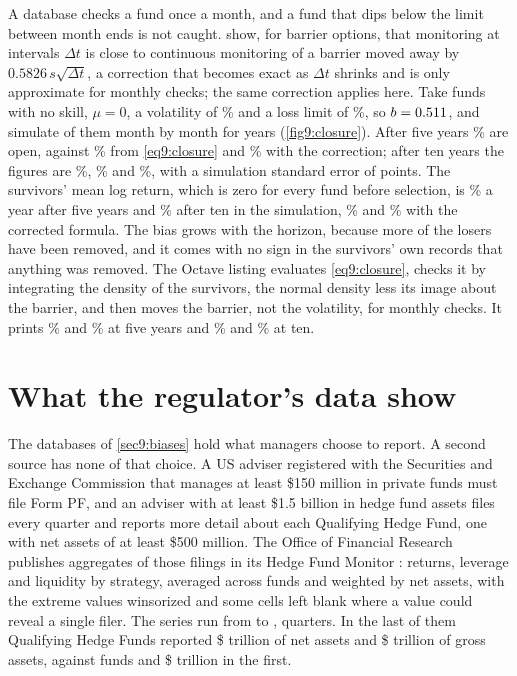 \begin{chapterrefs}
A database checks a fund once a month, and a fund that dips below the limit between month ends is not
caught. \textcite{broadie1997} show, for barrier options, that monitoring at intervals $\Delta t$ is close to
continuous monitoring of a barrier moved away by $0.5826\,s\sqrt{\Delta t}$, a correction that becomes
exact as $\Delta t$ shrinks and is only approximate for monthly checks; the same correction applies here. Take funds with no skill,
$\mu=0$, a volatility of \clSig\% and a loss limit of \clLoss\%, so $b=0.511$, and simulate \clFunds{} of them
month by month for \clYears{} years (\cref{fig9:closure}). After five years \clSurvSimFive\% are open, against
\clSurvFive\% from \cref{eq9:closure} and \clSurvBgkFive\% with the correction; after ten years the figures are
\clSurvSimTen\%, \clSurvTen\% and \clSurvBgkTen\%, with a simulation standard error of \clSurvSe{} points. The
survivors' mean log return, which is zero for every fund before selection, is \clMeanSimFive\% a year
after five years and \clMeanSimTen\% after ten in the simulation, \clMeanBgkFive\% and \clMeanBgkTen\% with the
corrected formula. The bias grows with the horizon, because more of the losers have been removed, and
it comes with no sign in the survivors' own records that anything was removed.
The Octave listing evaluates \cref{eq9:closure}, checks it by integrating the density of the
survivors, the normal density less its image about the barrier, and then moves the barrier, not the
volatility, for monthly checks. It prints \clSurvFive\% and \clSurvBgkFive\% at five years and
\clSurvTen\% and \clSurvBgkTen\% at ten.


\FloatBarrier
\section{What the regulator's data show}
\label{sec9:formpf}

The databases of \cref{sec9:biases} hold what managers choose to report. A second source has none of
that choice. A US adviser registered with the Securities and Exchange Commission that manages at least
\$150 million in private funds must file Form PF, and an adviser with at least \$1.5 billion in hedge
fund assets files every quarter and reports more detail about each Qualifying Hedge Fund, one with net
assets of at least \$500 million. The Office of Financial Research publishes aggregates of those
filings in its Hedge Fund Monitor \parencite{ofrhfm}: returns, leverage and liquidity by strategy,
averaged across funds and weighted by net assets, with the extreme values winsorized and some cells left
blank where a value could reveal a single filer. The series run from \hdFirst{} to \hdLast, \hdQuarters{}
quarters. In the last of them \hdCountLast{} Qualifying Hedge Funds reported \$\hdNavLast{} trillion of
net assets and \$\hdGavLast{} trillion of gross assets, against \hdCountFirst{} funds and \$\hdNavFirst{}
trillion in the first.


\end{chapterrefs}

